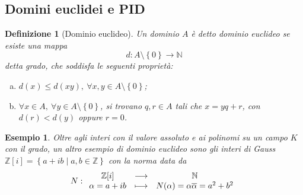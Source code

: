 \documentclass[12pt]{scrartcl}
\theoremstyle{style}
\newtheorem{esempio}{Esempio}[section]
\newtheorem{definizione}{Definizione}[section]
\numberwithin{equation}{subsection}
\begin{document}
\subsection{Domini euclidei e PID}
\begin{definizione}
	[Dominio euclideo]
	Un dominio $A$ \`e detto \textit{dominio euclideo} se esiste una mappa
	\[
	d : A \setminus\left\{ 0 \right\} \longrightarrow \mathbb{N}
	\] 
	detta \textit{grado}, che soddisfa le seguenti propriet\`a:
	\begin{enumerate}[(a).]
		\item $d(x) \le d(xy), \ \forall x,y \in A\setminus\left\{ 0 \right\} $;
		\item $\forall x \in A, \ \forall y \in A\setminus\left\{ 0 \right\} $, si trovano $q,r \in A$ tali che $x = yq + r$, con $d(r)<d(y)$ oppure $r=0$.
	\end{enumerate}
\end{definizione}
\begin{esempio}
	Oltre agli interi con il valore assoluto e ai polinomi su un campo $K$ con il grado, un altro esempio di dominio euclideo sono gli interi di Gauss $\mathbb{Z}[i] = \left\{ a + ib  \mid a,b \in \mathbb{Z} \right\} $ con la norma data da
	\[
	N :
	\begin{array}
		{c c c}
		\mathbb{Z}[i] &\longrightarrow & \mathbb{N}\\
		\alpha = a+ib &\longmapsto & N(\alpha ) = \alpha  \overline{\alpha }=a^2 + b^2
	\end{array}
	\] 
\end{esempio}
\end{document}

